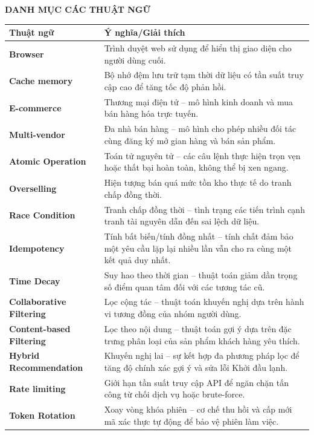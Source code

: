 \documentclass[../DoAn.tex]{subfiles}
\begin{document}
\begin{center}
    \Large{\textbf{DANH MỤC CÁC THUẬT NGỮ}}\\
\end{center}
\vspace{1cm}

\begin{longtable}{l p{11cm}}
	\hline
   \textbf{Thuật ngữ}  & \textbf{Ý nghĩa/Giải thích} \\ \hline 
	\textbf{Browser} & Trình duyệt web sử dụng để hiển thị giao diện cho người dùng cuối.\\
	\textbf{Cache memory} & Bộ nhớ đệm lưu trữ tạm thời dữ liệu có tần suất truy cập cao để tăng tốc độ phản hồi.\\
	\textbf{E-commerce} & Thương mại điện tử – mô hình kinh doanh và mua bán hàng hóa trực tuyến.\\
	\textbf{Multi-vendor} & Đa nhà bán hàng – mô hình cho phép nhiều đối tác cùng đăng ký mở gian hàng và bán sản phẩm.\\
	\textbf{Atomic Operation} & Toán tử nguyên tử – các câu lệnh thực hiện trọn vẹn hoặc thất bại hoàn toàn, không thể bị xen ngang.\\
	\textbf{Overselling} & Hiện tượng bán quá mức tồn kho thực tế do tranh chấp đồng thời.\\
	\textbf{Race Condition} & Tranh chấp đồng thời – tình trạng các tiến trình cạnh tranh tài nguyên dẫn đến sai lệch dữ liệu.\\
	\textbf{Idempotency} & Tính bất biến/tính đồng nhất – tính chất đảm bảo một yêu cầu lặp lại nhiều lần vẫn cho ra cùng một kết quả duy nhất.\\
	\textbf{Time Decay} & Suy hao theo thời gian – thuật toán giảm dần trọng số điểm quan tâm đối với các tương tác cũ.\\
	\textbf{Collaborative Filtering} & Lọc cộng tác – thuật toán khuyến nghị dựa trên hành vi tương đồng của nhóm người dùng.\\
	\textbf{Content-based Filtering} & Lọc theo nội dung – thuật toán gợi ý dựa trên đặc trưng phân loại của sản phẩm khách hàng yêu thích.\\
	\textbf{Hybrid Recommendation} & Khuyến nghị lai – sự kết hợp đa phương pháp lọc để tăng độ chính xác gợi ý và sửa lỗi Khởi đầu lạnh.\\
	\textbf{Rate limiting} & Giới hạn tần suất truy cập API để ngăn chặn tấn công từ chối dịch vụ hoặc brute-force.\\
	\textbf{Token Rotation} & Xoay vòng khóa phiên – cơ chế thu hồi và cấp mới mã xác thực tự động để bảo vệ phiên làm việc.\\

\end{longtable}
\end{document}
